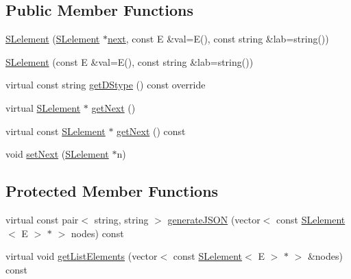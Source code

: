 \subsection*{Public Member Functions}
\begin{DoxyCompactItemize}
\item 
\mbox{\hyperlink{classbridges_1_1datastructure_1_1_s_lelement_ac69e99f5b2b729a217160ee0517751aa}{S\+Lelement}} (\mbox{\hyperlink{classbridges_1_1datastructure_1_1_s_lelement}{S\+Lelement}} $\ast$\mbox{\hyperlink{classbridges_1_1datastructure_1_1_s_lelement_afc016a593a4a5aba82021ee34edadbfc}{next}}, const E \&val=E(), const string \&lab=string())
\item 
\mbox{\hyperlink{classbridges_1_1datastructure_1_1_s_lelement_a2f56e5f74a2cb43ab6ea718ae5bfdcbf}{S\+Lelement}} (const E \&val=E(), const string \&lab=string())
\item 
virtual const string \mbox{\hyperlink{classbridges_1_1datastructure_1_1_s_lelement_a602156aacacd73d1faa365d68d8af31b}{get\+D\+Stype}} () const override
\item 
virtual \mbox{\hyperlink{classbridges_1_1datastructure_1_1_s_lelement}{S\+Lelement}} $\ast$ \mbox{\hyperlink{classbridges_1_1datastructure_1_1_s_lelement_ae43dd771d9ced7cb17f1d35f34cd9a42}{get\+Next}} ()
\item 
virtual const \mbox{\hyperlink{classbridges_1_1datastructure_1_1_s_lelement}{S\+Lelement}} $\ast$ \mbox{\hyperlink{classbridges_1_1datastructure_1_1_s_lelement_a8c62cb82fa64bbfe9ebb7334a5fea417}{get\+Next}} () const
\item 
void \mbox{\hyperlink{classbridges_1_1datastructure_1_1_s_lelement_acf736223b4cd27b0771b262870d70b94}{set\+Next}} (\mbox{\hyperlink{classbridges_1_1datastructure_1_1_s_lelement}{S\+Lelement}} $\ast$n)
\end{DoxyCompactItemize}
\subsection*{Protected Member Functions}
\begin{DoxyCompactItemize}
\item 
virtual const pair$<$ string, string $>$ \mbox{\hyperlink{classbridges_1_1datastructure_1_1_s_lelement_ac14d1b987e4803b9dc3180fd900198dc}{generate\+J\+S\+ON}} (vector$<$ const \mbox{\hyperlink{classbridges_1_1datastructure_1_1_s_lelement}{S\+Lelement}}$<$ E $>$ $\ast$ $>$ nodes) const
\item 
virtual void \mbox{\hyperlink{classbridges_1_1datastructure_1_1_s_lelement_ae23666410cc02ec8035d75c99c121c06}{get\+List\+Elements}} (vector$<$ const \mbox{\hyperlink{classbridges_1_1datastructure_1_1_s_lelement}{S\+Lelement}}$<$ E $>$ $\ast$ $>$ \&nodes) const
\end{DoxyCompactItemize}
